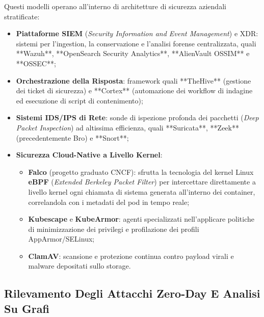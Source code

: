 \documentclass[11pt, a4paper]{article}
\begin{document}
Questi modelli operano all'interno di architetture di sicurezza aziendali stratificate:
\begin{itemize}
    \item \textbf{Piattaforme SIEM} (\emph{Security Information and Event Management}) e XDR: sistemi per l'ingestion, la conservazione e l'analisi forense centralizzata, quali **Wazuh**, **OpenSearch Security Analytics**, **AlienVault OSSIM** e **OSSEC**;
    \item \textbf{Orchestrazione della Risposta}: framework quali **TheHive** (gestione dei ticket di sicurezza) e **Cortex** (automazione dei workflow di indagine ed esecuzione di script di contenimento);
    \item \textbf{Sistemi IDS/IPS di Rete}: sonde di ispezione profonda dei pacchetti (\emph{Deep Packet Inspection}) ad altissima efficienza, quali **Suricata**, **Zeek** (precedentemente Bro) e **Snort**;
    \item \textbf{Sicurezza Cloud-Native a Livello Kernel}:
    \begin{itemize}
        \item \textbf{Falco} (progetto graduato CNCF): sfrutta la tecnologia del kernel Linux \textbf{eBPF} (\emph{Extended Berkeley Packet Filter}) per intercettare direttamente a livello kernel ogni chiamata di sistema generata all'interno dei container, correlandola con i metadati del pod in tempo reale;
        \item \textbf{Kubescape} e \textbf{KubeArmor}: agenti specializzati nell'applicare politiche di minimizzazione dei privilegi e profilazione dei profili AppArmor/SELinux;
        \item \textbf{ClamAV}: scansione e protezione continua contro payload virali e malware depositati sullo storage.
    \end{itemize}
\end{itemize}


\subsection{Rilevamento Degli Attacchi Zero-Day E Analisi Su Grafi}
\end{document}
